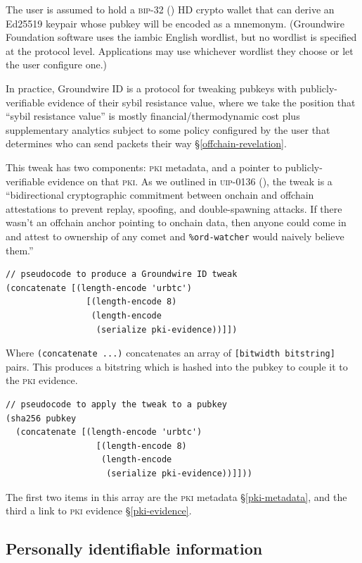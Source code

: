 \documentclass[twoside]{article}
\begin{document}
The user is assumed to hold a \textsc{bip}-32 (\citeyear{BIP0032}) HD crypto wallet
that can derive an Ed25519 keypair whose pubkey will be encoded as a
mnemonym. (Groundwire Foundation software uses the iambic English
wordlist, but no wordlist is specified at the protocol level.
Applications may use whichever wordlist they choose or let the user
configure one.)

In practice, Groundwire ID is a protocol for tweaking pubkeys with
publicly-verifiable evidence of their sybil resistance value, where we
take the position that ``sybil resistance value'' is mostly
financial/thermodynamic cost plus supplementary analytics
subject to some policy configured by the user that determines who can send
packets their way \S\ref{offchain-revelation}.

This tweak has two components: \textsc{pki} metadata, and a pointer to
publicly-verifiable evidence on that \textsc{pki}. As we outlined in
\textsc{uip}-0136 (\citeyear{UIP-0136}), the tweak is a
``bidirectional cryptographic commitment between onchain and offchain
attestations to prevent replay, spoofing, and double-spawning attacks. If
there wasn't an offchain anchor pointing to onchain data, then anyone
could come in and attest to ownership of any comet and \texttt{\%ord-watcher}
would naively believe them.''

\begin{lstlisting}[style=listingcode]
// pseudocode to produce a Groundwire ID tweak
(concatenate [(length-encode 'urbtc')
                [(length-encode 8)
                 (length-encode
                  (serialize pki-evidence))]])
\end{lstlisting}

Where \texttt{(concatenate\ ...)} concatenates an array of
\texttt{{[}bitwidth\ bitstring{]}} pairs. This produces a
bitstring which is hashed into the pubkey to couple it to the \textsc{pki} evidence.

\begin{lstlisting}[style=listingcode]
// pseudocode to apply the tweak to a pubkey
(sha256 pubkey
  (concatenate [(length-encode 'urbtc')
                  [(length-encode 8)
                   (length-encode
                    (serialize pki-evidence))]]))
\end{lstlisting}

The first two items in this array are the \textsc{pki} metadata \S\ref{pki-metadata}, and the
third a link to \textsc{pki} evidence \S\ref{pki-evidence}.

\subsection{Personally identifiable
information}\label{personally-identifiable-information}
\end{document}
